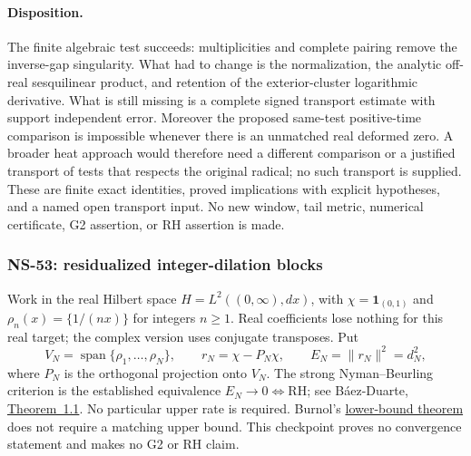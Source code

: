 \documentclass[11pt]{article}
\theoremstyle{remark}
\begin{document}
\paragraph{Disposition.}
The finite algebraic test succeeds: multiplicities and complete
pairing remove the inverse-gap singularity. What had to change is
the normalization, the analytic off-real sesquilinear product, and
retention of the exterior-cluster logarithmic derivative. What is
still missing is a complete signed transport estimate with support
independent error. Moreover the proposed same-test positive-time
comparison is impossible whenever there is an unmatched real
deformed zero. A broader heat approach would therefore need a
different comparison or a justified transport of tests that respects
the original radical; no such transport is supplied. These are
finite exact identities, proved implications with explicit hypotheses,
and a named open transport input. No new window, tail metric,
numerical certificate, G2 assertion, or RH assertion is made.


\subsubsection{NS-53: residualized integer-dilation blocks}
\label{sec:ns53-nb-blocks}

Work in the real Hilbert space $H=L^2((0,\infty),dx)$, with
$\chi=\mathbf 1_{(0,1)}$ and $\rho_n(x)=\{1/(nx)\}$ for integers $n\geq1$.
Real coefficients lose nothing for this real target; the complex version
uses conjugate transposes. Put
\[
 V_N=\operatorname{span}\{\rho_1,\ldots,\rho_N\},\qquad
 r_N=\chi-P_N\chi,\qquad E_N=\|r_N\|^2=d_N^2,
\]
where $P_N$ is the orthogonal projection onto $V_N$.
The strong Nyman--Beurling criterion is the established equivalence
$E_N\to0\Longleftrightarrow\mathrm{RH}$; see B\'aez-Duarte,
\href{https://arxiv.org/abs/math/0202141}{Theorem~1.1}.
No particular upper rate is required. Burnol's
\href{https://doi.org/10.1006/aima.2001.2066}{lower-bound theorem}
does not require a matching upper bound. This checkpoint proves no
convergence statement and makes no G2 or RH claim.
\end{document}
